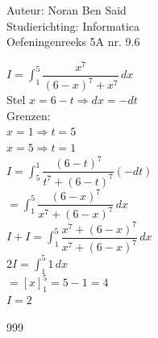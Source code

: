 \documentclass[a4paper]{article}
\begin{document}
  
\noindent \large Auteur: Noran Ben Said \\
\noindent \large Studierichting: Informatica\\
\noindent \large Oefeningenreeks 5A nr. 9.6 \\
\medskip

\normalsize

$ I = \displaystyle\int_1^5 \dfrac{x^7}{(6-x)^7 + x^7}\,dx$\\

Stel $ x = 6 - t \Rightarrow dx = -dt$\\

Grenzen:\\

$x=1 \Rightarrow t=5$\\

$x=5 \Rightarrow t=1$\\

$ I = \displaystyle\int_5^1 \dfrac{(6-t)^7}{t^7 + (6-t)^7}(-dt)$\\

$ = \displaystyle\int_1^5 \dfrac{(6-x)^7}{x^7 + (6-x)^7}\,dx$\\

$ I + I = \displaystyle\int_1^5 \dfrac{x^7 + (6-x)^7}{x^7 + (6-x)^7}\,dx$\\

$ 2I = \displaystyle\int_1^5 1\,dx$\\

$ = \left[x\right]_1^5  = 5 - 1 = 4$\\

$ I = 2$\\


\begin{thebibliography}{999}
\end{thebibliography}
\end{document}
